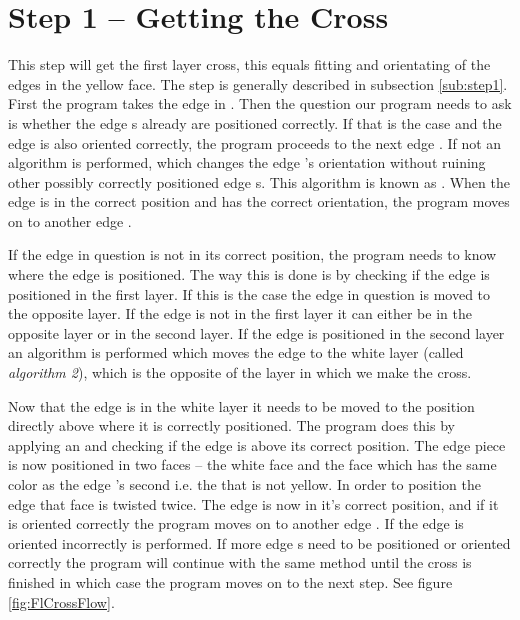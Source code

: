 \section{Step 1 -- Getting the Cross}
This step will get the first layer cross, this equals fitting and orientating of the edges in the yellow face. 
The step is generally described in subsection \ref{sub:step1}.
First the program takes the edge \cubie{} in \cubicle{} .
Then the question our program needs to ask is whether the edge \cpiece{}s already are positioned correctly.
If that is the case and the edge \cpiece{} is also oriented correctly, the program proceeds to the next edge \cpiece{}.
If not an algorithm is performed, which changes the edge \cpiece{}'s orientation without ruining other possibly correctly positioned edge \cpiece{}s. 
This algorithm is known as . When the edge \cpiece{} is in the correct position and has the correct orientation, the program moves on to another edge \cpiece{}. 

If the edge \cpiece{} in question is not in its correct position, the program needs to know where the edge is positioned. 
The way this is done is by checking if the edge \cpiece{} is positioned in the first layer. 
If this is the case the edge \cpiece{} in question is moved to the opposite layer. 
If the edge \cpiece{} is not in the first layer it can either be in the opposite layer or in the second layer.
If the edge \cpiece{} is positioned in the second layer an algorithm is performed which moves the edge \cpiece{} to the white layer (called \textit{algorithm 2}), which is the opposite of the layer in which we make the cross.

Now that the edge \cpiece{} is in the white layer it needs to be moved to the position directly above where it is correctly positioned. 
The program does this by applying an  \twist{} and checking if the edge \cpiece{} is above its correct position.
The edge piece is now positioned in two faces -- the white face and the face which has the same color as the edge  \cpiece{}'s second \facelet{} i.e. the \facelet{} that is not yellow.
In order to position the edge \cpiece{} that face is twisted twice.
The edge \cpiece{} is now in it's correct position, and if it is oriented correctly the program moves on to another edge  \cpiece{} .
If the edge \cpiece{} is oriented incorrectly  is performed. If more edge \cpiece{}s need to be positioned or oriented correctly the program will continue with the same method until the cross is finished in which case the program moves on to the next step. See figure \ref{fig:FlCrossFlow}.

